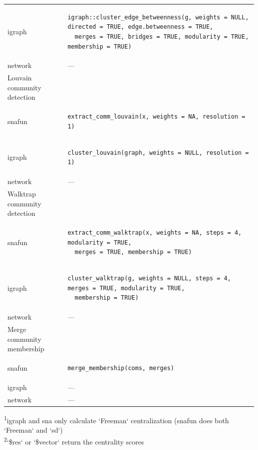 \documentclass[
]{article}
\begin{document}
\begin{longtable}{ll}
igraph & \begin{verbatim}
igraph::cluster_edge_betweenness(g, weights = NULL, directed = TRUE, edge.betweenness = TRUE,
  merges = TRUE, bridges = TRUE, modularity = TRUE, membership = TRUE)
\end{verbatim} \\ 
network & — \\ 
\midrule
\multicolumn{1}{l}{Louvain community detection} \\ 
\midrule
snafun & \begin{verbatim}
extract_comm_louvain(x, weights = NA, resolution = 1)
\end{verbatim} \\ 
igraph & \begin{verbatim}
cluster_louvain(graph, weights = NULL, resolution = 1)
\end{verbatim} \\ 
network & — \\ 
\midrule
\multicolumn{1}{l}{Walktrap community detection} \\ 
\midrule
snafun & \begin{verbatim}
extract_comm_walktrap(x, weights = NA, steps = 4, modularity = TRUE,
  merges = TRUE, membership = TRUE)
\end{verbatim} \\ 
igraph & \begin{verbatim}
cluster_walktrap(g, weights = NULL, steps = 4, merges = TRUE, modularity = TRUE, 
  membership = TRUE)
\end{verbatim} \\ 
network & — \\ 
\midrule
\multicolumn{1}{l}{Merge community membership} \\ 
\midrule
snafun & \begin{verbatim}
merge_membership(coms, merges)
\end{verbatim} \\ 
igraph & — \\ 
network & — \\ 
\bottomrule
\end{longtable}
\begin{minipage}{\linewidth}
\textsuperscript{1}igraph and sna only calculate `Freeman` centralization (snafun 
    does both `Freeman` and `sd`)\\
\textsuperscript{2}`\$res` or `\$vector` return the centrality scores\\
\end{minipage}
\end{document}
